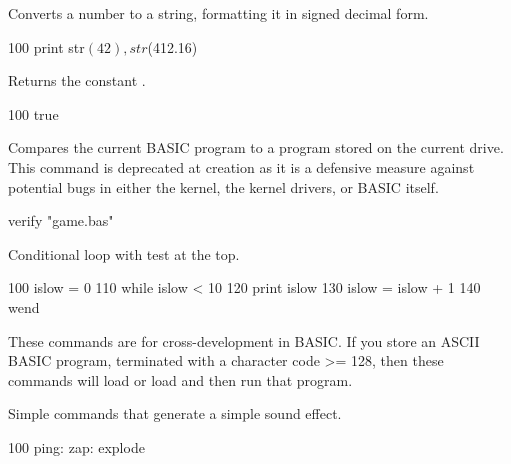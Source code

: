 \begin{entry}
Converts a number to a string, formatting it in signed decimal form.

\begin{lstexample}
100 print str$(42), str$(412.16)
\end{lstexample}
\end{entry}

\begin{entry}
Returns the constant .

\begin{lstexample}
100 true
\end{lstexample}
\end{entry}

\begin{entry}
Compares the current BASIC program to a program stored on the current drive. This command is deprecated at creation as it is a defensive measure against potential bugs in either the kernel, the kernel drivers, or BASIC itself.

\begin{lstexample}
verify "game.bas"
\end{lstexample}
\end{entry}

\begin{entry}
Conditional loop with test at the top.

\begin{lstexample}
100 islow = 0
110 while islow < 10
120 print islow
130 islow = islow + 1
140 wend
\end{lstexample}
\end{entry}

\begin{entry}
These commands are for cross-development in BASIC. If you store an ASCII BASIC program, terminated with a character code >= 128, then these commands will load or load and then run that program.
\end{entry}

\begin{entry}
Simple commands that generate a simple sound effect.

\begin{lstexample}
100 ping: zap: explode
\end{lstexample}
\end{entry}
